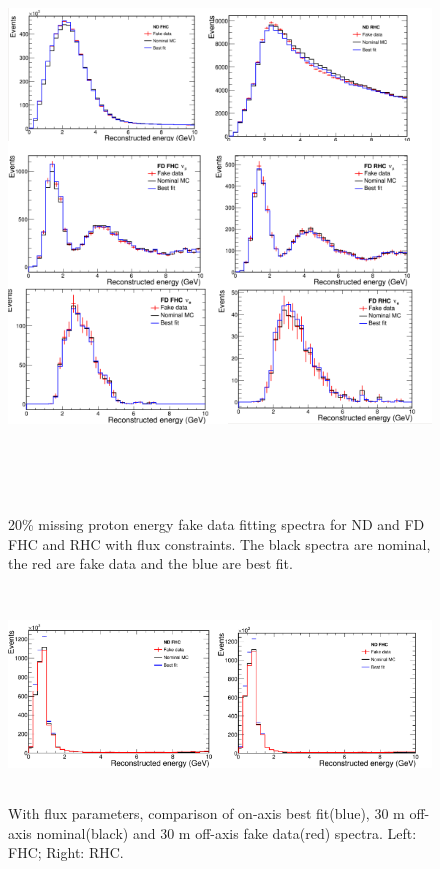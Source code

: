 \begin{figure}[h]
\centering
\includegraphics[angle=0,width=16cm,height=15.6cm]{graphics/protonFDS_spectra1.png}
\caption{20\% missing proton energy fake data fitting spectra for ND and FD FHC and RHC with flux constraints. The black spectra are nominal, the red are fake data and the blue are best fit.}
\label{fig:protonFDS_spectra1}
\end{figure}

\begin{figure}[h]
\centering
\includegraphics[angle=0,width=16cm,height=5.6cm]{graphics/protonFDS_spectra2.png}
\caption{With flux parameters, comparison of on-axis best fit(blue), 30 m off-axis nominal(black) and 30 m off-axis fake data(red) spectra. Left: FHC; Right: RHC. }
\label{fig:protonFDS_spectra2}
\end{figure}
